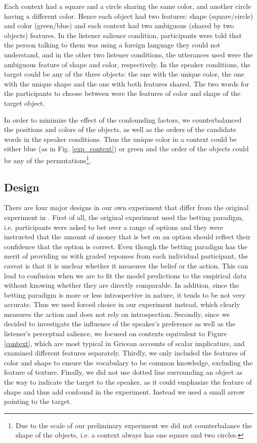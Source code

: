 Each context had a square and a circle sharing the same color, and another circle having a different color. Hence each object had two features: shape (square/circle) and color (green/blue) and each context had two ambiguous (shared by two objects) features. In the listener salience condition, participants were told that the person talking to them was using a foreign language they could not understand, and in the other two listener conditions, the utterances used were the ambiguous feature of shape and color, respectively. In the speaker conditions, the target could be any of the three objects: the one with the unique color, the one with the unique shape and the one with both features shared. The two words for the participants to choose between were the features of color and shape of the target object.

In order to minimize the effect of the confounding factors, we counterbalanced the positions and colors of the objects, as well as the orders of the candidate words in the speaker conditions. Thus the unique color in a context could be either blue (as in Fig. \ref{exp_context}) or green and the order of the objects could be any of the permutations\footnote{Due to the scale of our preliminary experiment we did not counterbalance the shape of the objects, i.e. a context always has one square and two circles. }.

\subsection*{Design}

There are four major designs in our own experiment that differ from the original experiment in \cite{Frank}. First of all, the original experiment used the betting paradigm, i.e. participants were asked to bet over a range of options and they were instructed that the amount of money that is bet on an option should reflect their confidence that the option is correct. Even though the betting paradigm has the merit of providing us with graded reponses from each individual participant, the caveat is that it is unclear whether it measures the belief or the action. This can lead to confusion when we are to fit the model predictions to the empirical data without knowing whether they are directly comparable. In addition, since the betting paradigm is more or less introspective in nature, it tends to be not very accurate. Thus we used forced choice in our experiment instead, which clearly measures the action and does not rely on introspection.
Secondly, since we decided to investigate the influence of the speaker's preference as well as the listener's perceptual salience, we focused on contexts equivalent to Figure \ref{context}, which are most typical in Gricean accounts of scalar implicature, and examined different features separately.
Thirdly, we only included the features of color and shape to ensure the vocabulary to be common knowledge, excluding the feature of texture. Finally, we did not use dotted line surrounding an object as the way to indicate the target to the speaker, as it could emphasize the feature of shape and thus add confound in the experiment. Instead we used a small arrow pointing to the target. 

